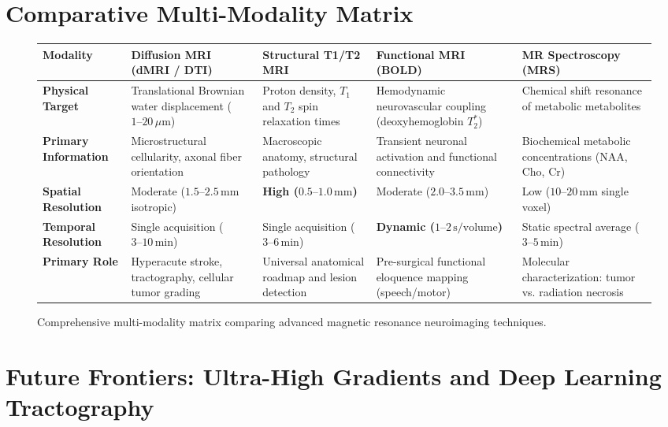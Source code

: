 \documentclass[11pt,a4paper]{article}
\begin{document}
\newpage
\section{Comparative Multi-Modality Matrix}

\begin{figure}[htbp]
\centering
\small
\setlength{\tabcolsep}{3pt}
\begin{tabular}{p{2.6cm}p{3.0cm}p{3.1cm}p{3.1cm}p{2.8cm}}
\toprule
\textbf{Modality} & \textbf{Diffusion MRI (dMRI / DTI)} & \textbf{Structural T1/T2 MRI} & \textbf{Functional MRI (BOLD)} & \textbf{MR Spectroscopy (MRS)} \\
\midrule
\textbf{Physical Target} & Translational Brownian water displacement ($1\text{--}20\,\mu\text{m}$) & Proton density, $T_1$ and $T_2$ spin relaxation times & Hemodynamic neurovascular coupling (deoxyhemoglobin $T_2^*$) & Chemical shift resonance of metabolic metabolites \\
\addlinespace
\textbf{Primary Information} & Microstructural cellularity, axonal fiber orientation & Macroscopic anatomy, structural pathology & Transient neuronal activation and functional connectivity & Biochemical metabolic concentrations (NAA, Cho, Cr) \\
\addlinespace
\textbf{Spatial Resolution} & Moderate ($1.5\text{--}2.5\,\text{mm}$ isotropic) & \textbf{High ($0.5\text{--}1.0\,\text{mm}$)} & Moderate ($2.0\text{--}3.5\,\text{mm}$) & Low ($10\text{--}20\,\text{mm}$ single voxel) \\
\addlinespace
\textbf{Temporal Resolution} & Single acquisition ($3\text{--}10\,\text{min}$) & Single acquisition ($3\text{--}6\,\text{min}$) & \textbf{Dynamic ($1\text{--}2\,\text{s/volume}$)} & Static spectral average ($3\text{--}5\,\text{min}$) \\
\addlinespace
\textbf{Primary Role} & Hyperacute stroke, tractography, cellular tumor grading & Universal anatomical roadmap and lesion detection & Pre-surgical functional eloquence mapping (speech/motor) & Molecular characterization: tumor vs. radiation necrosis \\
\bottomrule
\end{tabular}
\caption{Comprehensive multi-modality matrix comparing advanced magnetic resonance neuroimaging techniques.}
\label{tab:mri_comparison}
\end{figure}

\section{Future Frontiers: Ultra-High Gradients and Deep Learning Tractography}
\end{document}
